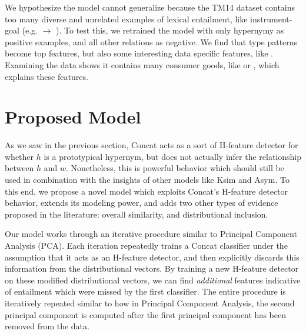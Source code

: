 We hypothesize the model cannot generalize because the TM14 dataset contains
too many diverse and unrelated examples of lexical entailment, like
instrument-goal (e.g.  $\rightarrow$ ).
To test this, we retrained the model with only
hypernymy as positive examples, and all other relations as negative.  We find
that  type patterns become top features, but also some interesting
data specific features, like .  Examining the data
shows it contains many consumer goods, like  or ,
which explains these features.


\section{Proposed Model}
\label{sec:hfeatproposed}

As we saw in the previous section, Concat acts as a sort of H-feature
detector for whether $h$ is a prototypical hypernym, but does not actually
infer the relationship between $h$ and $w$. Nonetheless, this is powerful
behavior which should still be used in combination with the insights of other
models like Ksim and Asym. To this end, we propose a novel model which exploits
Concat's H-feature detector behavior, extends its modeling power, and adds two
other types of evidence proposed in the literature: overall similarity, and
distributional inclusion.

Our model works through an iterative procedure similar to Principal Component
Analysis (PCA). Each iteration repeatedly trains a Concat classifier under the
assumption that it acts as an H-feature detector, and then explicitly discards
this information from the distributional vectors. By training a new H-feature
detector on these modified distributional vectors, we can find {\em additional}
features indicative of entailment which were missed by the first classifier.
The entire procedure is iteratively repeated similar to how in Principal
Component Analysis, the second principal component is computed after the first
principal component has been removed from the data.

